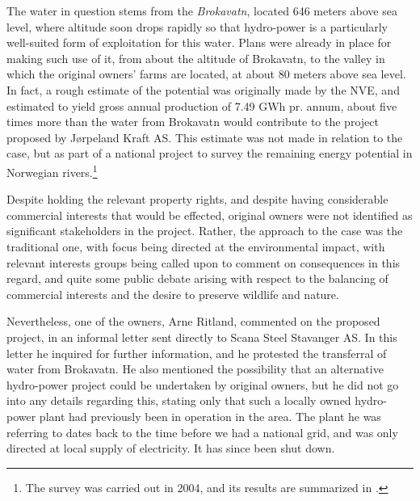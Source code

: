 The water in question stems from the \emph{Brokavatn}, located 646 meters above sea level, where altitude soon drops rapidly so that hydro-power is a particularly well-suited form of exploitation for this water. Plans were already in place for making such use of it, from about the altitude of Brokavatn, to the valley in which the original owners' farms are located, at about 80 meters above sea level. In fact, a rough estimate of the potential was originally made by the NVE, and estimated to yield gross annual production of 7.49 GWh pr. annum, about five times more than the water from Brokavatn would contribute to the project proposed by Jørpeland Kraft AS. This estimate was not made in relation to the case, but as part of a national project to survey the remaining energy potential in Norwegian rivers.\footnote{The survey was carried out in 2004, and its results are summarized in \cite{kartlegging}.}  

Despite holding the relevant property rights, and despite having considerable commercial interests that would be effected, original owners were not identified as significant stakeholders in the project. Rather, the approach to the case was the traditional one, with focus being directed at the environmental impact, with relevant interests groups being called upon to comment on consequences in this regard, and quite some public debate arising with respect to the balancing of commercial interests and the desire to preserve wildlife and nature.

Nevertheless, one of the owners, Arne Ritland, commented on the proposed project, in an informal letter sent directly to Scana Steel Stavanger AS. In this letter he inquired for further information, and he protested the transferral of water from Brokavatn. He also mentioned the possibility that an alternative hydro-power project could be undertaken by original owners, but he did not go into any details regarding this, stating only that such a locally owned hydro-power plant had previously been in operation in the area. The plant he was referring to dates back to the time before we had a national grid, and was only directed at local supply of electricity. It has since been shut down.

